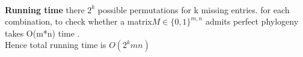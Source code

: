 \begin{enumerate}
\begin{enumerate}
{{\\
\textbf{Running time}
there $2^k$ possible permutations for k missing entries. 
for each combination, to check whether a matrix$ M \in \{0, 1\}^{m,n}$ admits perfect phylogeny takes O(m*n) time .\\ 

Hence total running time is $O(2^k  mn)$
\vspace{3cm}
}}

\end{enumerate}
\end{enumerate}


